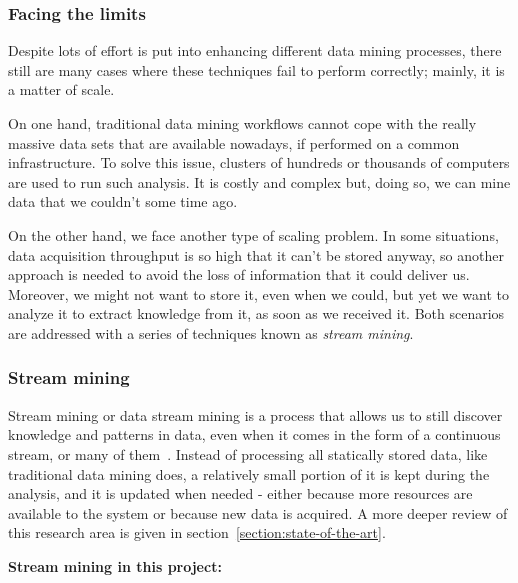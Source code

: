 \subsubsection{Facing the limits}

Despite lots of effort is put into enhancing different data mining processes, there still are many cases where these techniques fail to perform correctly; mainly, it is a matter of scale.

On one hand, traditional data mining workflows cannot cope with the really massive data sets that are available nowadays, if performed on a common infrastructure. To solve this issue, clusters of hundreds or thousands of computers are used to run such analysis. It is costly and complex but, doing so, we can mine data that we couldn’t some time ago.

On the other hand, we face another type of scaling problem. In some situations, data acquisition throughput is so high that it can’t be stored anyway, so another approach is needed to avoid the loss of information that it could deliver us. Moreover, we might not want to store it, even when we could, but yet we want to analyze it to extract knowledge from it, as soon as we received it. Both scenarios are addressed with a series of techniques known as \textit{stream mining}.

\subsubsection{Stream mining}

Stream mining or data stream mining is a process that allows us to still discover knowledge and patterns in data, even when it comes in the form of a continuous stream, or many of them~\cite{Rajaraman:2011:MMD:2124405}. Instead of processing all statically stored data, like traditional data mining does, a relatively small portion of it is kept during the analysis, and it is updated when needed - either because more resources are available to the system or because new data is acquired. A more deeper review of this research area is given in section~\ref{section:state-of-the-art}.

\textbf{Stream mining in this project:}

